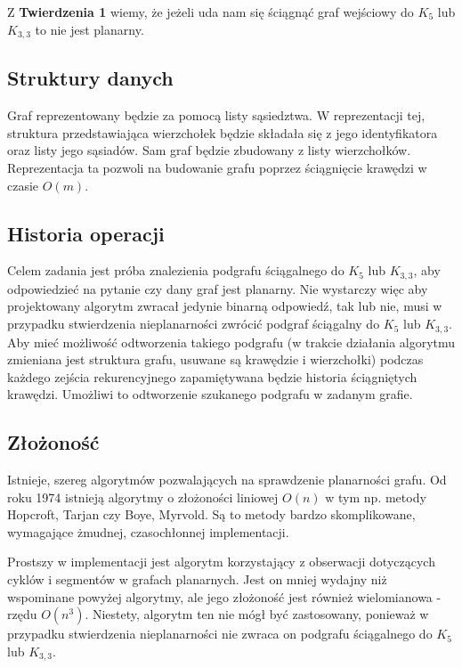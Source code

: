 \documentclass[a4 122pt]{article}
\begin{document}
		Z \textbf{Twierdzenia 1} wiemy, że jeżeli uda nam się ściągnąć graf wejściowy do $K_5$ lub $K_{3,3}$ to nie jest planarny. 
	
	\subsection{Struktury danych}

		Graf reprezentowany będzie za pomocą listy sąsiedztwa. 
		W reprezentacji tej, struktura przedstawiająca wierzchołek będzie składała się z jego identyfikatora oraz listy jego sąsiadów. 
		Sam graf będzie zbudowany z listy wierzchołków. 
		Reprezentacja ta pozwoli na budowanie grafu poprzez ściągnięcie krawędzi w czasie $O(m)$.
	
	\subsection{Historia operacji}
		Celem zadania jest próba znalezienia podgrafu ściągalnego do $K_5$ lub $K_{3,3}$, aby odpowiedzieć na pytanie czy dany graf jest planarny. 
		Nie wystarczy więc aby projektowany algorytm zwracał jedynie binarną odpowiedź, tak lub nie, musi w przypadku stwierdzenia nieplanarności zwrócić podgraf ściągalny do $K_5$ lub $K_{3,3}$.
		Aby mieć możliwość odtworzenia takiego podgrafu (w trakcie działania algorytmu zmieniana jest struktura grafu, usuwane są krawędzie i wierzchołki) podczas każdego zejścia rekurencyjnego zapamiętywana będzie historia ściągniętych krawędzi. 
		Umożliwi to odtworzenie szukanego podgrafu w zadanym grafie.
	
	\subsection{Złożoność}
	
		Istnieje, szereg algorytmów pozwalających na sprawdzenie planarności grafu.
		Od roku 1974 istnieją algorytmy o złożoności liniowej $O(n)$ w tym np. metody Hopcroft, Tarjan czy Boye, Myrvold.
		Są to metody bardzo skomplikowane, wymagające żmudnej, czasochłonnej implementacji.
		
		Prostszy w implementacji jest algorytm korzystający z obserwacji dotyczących cyklów i segmentów w grafach planarnych. 
		Jest on mniej wydajny niż wspominane powyżej algorytmy, ale jego złożoność jest również wielomianowa - rzędu $O(n^3)$. 
		Niestety, algorytm ten nie mógł być zastosowany, ponieważ w przypadku stwierdzenia nieplanarności nie zwraca on podgrafu ściągalnego do $K_5$ lub $K_{3, 3}$.
		
\end{document}
